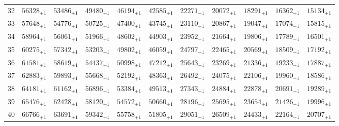 \documentclass[10pt, a4paper]{article}
\begin{document}
\begin{center}
\begin{longtable}{c || c c c c c | c c c c c}
        32 & \({56328}_{+1}\) & \({53486}_{+1}\) & \({49480}_{+1}\) & \({46194}_{+1}\) & \({42585}_{+1}\) & \({22271}_{+1}\) & \({20072}_{+1}\) & \({18291}_{+1}\) & \({16362}_{+1}\) & \({15134}_{+1}\)\\
        33 & \({57648}_{+1}\) & \({54776}_{+1}\) & \({50725}_{+1}\) & \({47400}_{+1}\) & \({43745}_{+1}\) & \({23110}_{+1}\) & \({20867}_{+1}\) & \({19047}_{+1}\) & \({17074}_{+1}\) & \({15815}_{+1}\)\\
        34 & \({58964}_{+1}\) & \({56061}_{+1}\) & \({51966}_{+1}\) & \({48602}_{+1}\) & \({44903}_{+1}\) & \({23952}_{+1}\) & \({21664}_{+1}\) & \({19806}_{+1}\) & \({17789}_{+1}\) & \({16501}_{+1}\)\\
        35 & \({60275}_{+1}\) & \({57342}_{+1}\) & \({53203}_{+1}\) & \({49802}_{+1}\) & \({46059}_{+1}\) & \({24797}_{+1}\) & \({22465}_{+1}\) & \({20569}_{+1}\) & \({18509}_{+1}\) & \({17192}_{+1}\)\\
        \hline
        36 & \({61581}_{+1}\) & \({58619}_{+1}\) & \({54437}_{+1}\) & \({50998}_{+1}\) & \({47212}_{+1}\) & \({25643}_{+1}\) & \({23269}_{+1}\) & \({21336}_{+1}\) & \({19233}_{+1}\) & \({17887}_{+1}\)\\
        37 & \({62883}_{+1}\) & \({59893}_{+1}\) & \({55668}_{+1}\) & \({52192}_{+1}\) & \({48363}_{+1}\) & \({26492}_{+1}\) & \({24075}_{+1}\) & \({22106}_{+1}\) & \({19960}_{+1}\) & \({18586}_{+1}\)\\
        38 & \({64181}_{+1}\) & \({61162}_{+1}\) & \({56896}_{+1}\) & \({53384}_{+1}\) & \({49513}_{+1}\) & \({27343}_{+1}\) & \({24884}_{+1}\) & \({22878}_{+1}\) & \({20691}_{+1}\) & \({19289}_{+1}\)\\
        39 & \({65476}_{+1}\) & \({62428}_{+1}\) & \({58120}_{+1}\) & \({54572}_{+1}\) & \({50660}_{+1}\) & \({28196}_{+1}\) & \({25695}_{+1}\) & \({23654}_{+1}\) & \({21426}_{+1}\) & \({19996}_{+1}\)\\
        40 & \({66766}_{+1}\) & \({63691}_{+1}\) & \({59342}_{+1}\) & \({55758}_{+1}\) & \({51805}_{+1}\) & \({29051}_{+1}\) & \({26509}_{+1}\) & \({24433}_{+1}\) & \({22164}_{+1}\) & \({20707}_{+1}\)\\
        \hline
    \end{longtable}
\end{center}
\pagebreak
\end{document}
